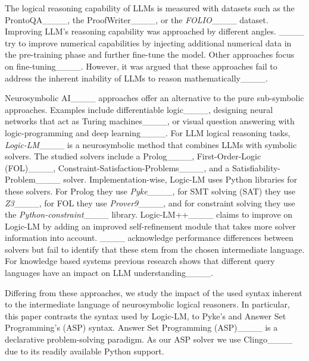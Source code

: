 The logical reasoning capability of LLMs is measured with datasets such as
the ProntoQA____,  
the ProofWriter____, or
the \textit{FOLIO}____ dataset.
%
%
Improving LLM's reasoning capability was approached by different angles.
____ try to improve numerical capabilities
by injecting additional numerical data in the pre-training phase
and further fine-tune the model.
Other approaches focus on fine-tuning____.
However, it was argued that these approaches fail to address the inherent inability of LLMs to reason 
mathematically____.

Neurosymbolic AI____ approaches offer an alternative to the pure sub-symbolic approaches.
Examples include differentiable logic____,
designing neural networks that act as Turing machines____,
or visual question answering with logic-programming and
deep learning____.
For LLM logical reasoning tasks, 
\textit{Logic-LM}____ is a neurosymbolic method that
combines LLMs with symbolic solvers.
The studied solvers include a Prolog____, First-Order-Logic (FOL)____, Constraint-Satisfaction-Problems____, and a Satisfiability-Problem____ solver.
Implementation-wise, Logic-LM uses Python libraries for these solvers.
For Prolog they use \textit{Pyke}____,
for SMT solving (SAT) they use \textit{Z3}____,
for FOL they use \textit{Prover9}____,
and for constraint solving they use the \textit{Python-constraint}____ library.
Logic-LM++____ claims to improve on Logic-LM
by adding an improved self-refinement module that
takes more solver information into account.
____ acknowledge performance differences between solvers
but fail to identify that these stem from the chosen intermediate language.
For knowledge based systems previous research shows that different query languages have an
impact on LLM understanding____.

Differing from these approaches,
we study the impact of the used syntax inherent to the intermediate language of 
neurosymbolic logical reasoners.
In particular, this paper contrasts the syntax used by Logic-LM, to Pyke's
and Answer Set Programming's (ASP) syntax.
Answer Set Programming (ASP)____ is a declarative problem-solving paradigm.
As our ASP solver we use Clingo____ due to its
readily available Python support.
%